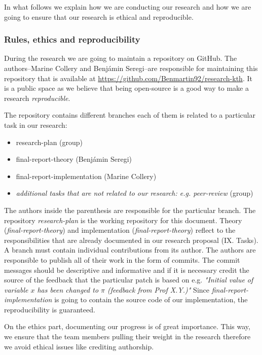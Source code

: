 \documentclass[letterpaper, 10 pt, conference]{ieeeconf}  %
\begin{document}
In what follows we explain how we are conducting our research and how we are going to ensure that our research is ethical and reproducible.
\subsubsection*{Rules, ethics and reproducibility}
During the research we are going to maintain a repository on GitHub. The authors\---Marine Collery and Benjámin Seregi\---are responsible for maintaining this repository that is available at \url{https://github.com/Benmartin92/research-kth}. It is a public space as we believe that being open-source is a good way to make a research \textit{reproducible}.

The repository contains different branches each of them is related to a particular task in our research:
\begin{itemize}
\item research-plan (group)
\item final-report-theory (Benjámin Seregi)
\item final-report-implementation (Marine Collery)
\item \textit{additional tasks that are not related to our research: e.g. peer-review} (group)
\end{itemize}
The authors inside the parenthesis are responsible for the particular branch. The repository \textit{research-plan} is the working repository for this document. Theory (\textit{final-report-theory}) and implementation (\textit{final-report-theory}) reflect to the responsibilities that are already documented in our research proposal (IX. Tasks).
A branch must contain individual contributions from its author. The authors are responsible to publish all of their work in the form of commits. The commit messages should be descriptive and informative and if it is necessary credit the source of the feedback that the particular patch is based on e.g. \textit{"Initial value of variable $x$ has been changed to $\pi$ (feedback from Prof X.Y.)"}
Since \textit{final-report-implementation} is going to contain the source code of our implementation, the reproducibility is guaranteed.

On the ethics part, documenting our progress is of great importance. This way, we ensure that the team members pulling their weight in the research therefore we avoid ethical issues like crediting authorship.

\addtolength{\textheight}{-12cm}   %




\end{document}
